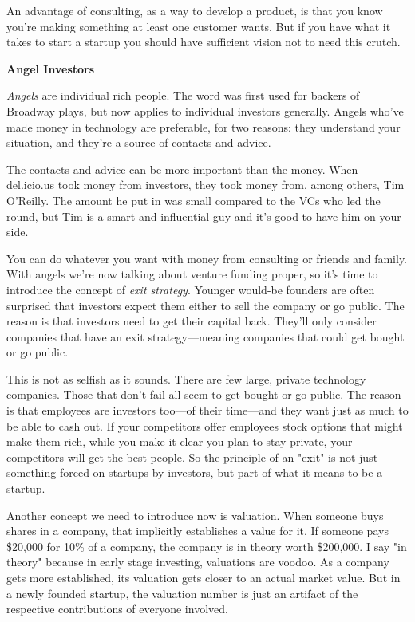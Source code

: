 An advantage of consulting, as a way to develop a product, is that
you know you're making something at least one customer wants.  But
if you have what it takes to start a startup you should have
sufficient vision not to need this crutch.

\textbf{Angel Investors}

\emph{Angels} are individual rich people.  The word was first used
for backers of Broadway plays, but now applies to individual investors
generally.  Angels who've made money in technology are preferable,
for two reasons: they understand your situation, and they're a
source of contacts and advice.

The contacts and advice can be more important than the money.  When
del.icio.us took money from investors, they took money from, among
others, Tim O'Reilly.  The amount he put in was small compared to
the VCs who led the round, but Tim is a smart and influential guy
and it's good to have him on your side.

You can do whatever you want with money from consulting or friends
and family.  With angels we're now talking about venture funding
proper, so it's time to introduce the concept of \emph{exit strategy}.
Younger would-be founders are often surprised that investors expect
them either to sell the company or go public.  The reason is that
investors need to get their capital back.  They'll only consider
companies that have an exit strategy---meaning companies that could
get bought or go public.

This is not as selfish as it sounds.  There are few large, private
technology companies.  Those that don't fail all seem to get bought
or go public.  The reason is that employees are investors too---of
their time---and they want just as much to be able to cash out.  If
your competitors offer employees stock options that might make them
rich, while you make it clear you plan to stay private, your
competitors will get the best people. So the principle of an "exit"
is not just something forced on startups by investors, but part of
what it means to be a startup.

Another concept we need to introduce now is valuation.  When someone
buys shares in a company, that implicitly establishes a value for
it.  If someone pays \$20,000 for 10\% of a company, the company is
in theory worth \$200,000.  I say "in theory" because in early stage
investing, valuations are voodoo.  As a company gets more established,
its valuation gets closer to an actual market value.  But in a newly
founded startup, the valuation number is just an artifact of the
respective contributions of everyone involved.

